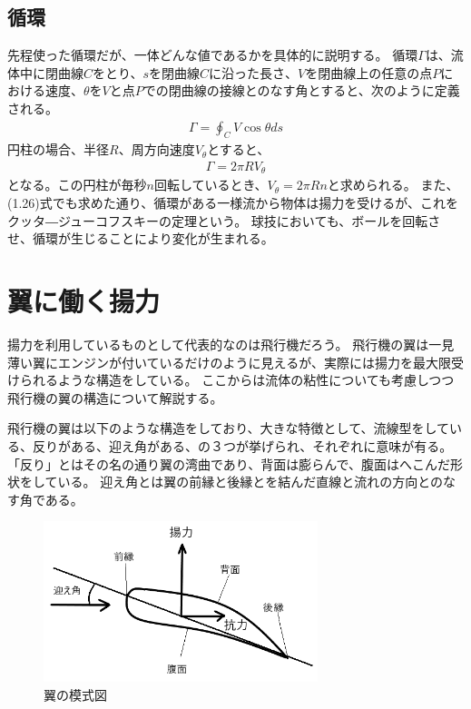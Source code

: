 \documentclass[10pt,b5paper,papersize,dvipdfmx]{jsbook}
\begin{document}
\subsection{循環}
先程使った循環だが、一体どんな値であるかを具体的に説明する。
循環$\Gamma$は、流体中に閉曲線$C$をとり、$s$を閉曲線$C$に沿った長さ、$V$を閉曲線上の任意の点$P$における速度、$\theta$を$V$と点$P$での閉曲線の接線とのなす角とすると、次のように定義される。
\begin{align}
  \Gamma = \oint_C V\cos\theta ds
\end{align}
円柱の場合、半径$R$、周方向速度$V_\theta$とすると、
\begin{align}
  \Gamma = 2\pi RV_\theta
\end{align}
となる。この円柱が毎秒$n$回転しているとき、$V_\theta = 2\pi Rn$と求められる。
また、(1.26)式でも求めた通り、循環がある一様流から物体は揚力を受けるが、これをクッタ―ジューコフスキーの定理という。
球技においても、ボールを回転させ、循環が生じることにより変化が生まれる。

\section{翼に働く揚力}
揚力を利用しているものとして代表的なのは飛行機だろう。
飛行機の翼は一見薄い翼にエンジンが付いているだけのように見えるが、実際には揚力を最大限受けられるような構造をしている。
ここからは流体の粘性についても考慮しつつ飛行機の翼の構造について解説する。
\par
飛行機の翼は以下のような構造をしており、大きな特徴として、流線型をしている、反りがある、迎え角がある、の３つが挙げられ、それぞれに意味が有る。
「反り」とはその名の通り翼の湾曲であり、背面は膨らんで、腹面はへこんだ形状をしている。
迎え角とは翼の前縁と後縁とを結んだ直線と流れの方向とのなす角である。
\begin{figure}[ht]
  \centering
  \includegraphics[width=80mm]{img/ryuutai4.png}
  \caption{翼の模式図}
\end{figure}
\end{document}
